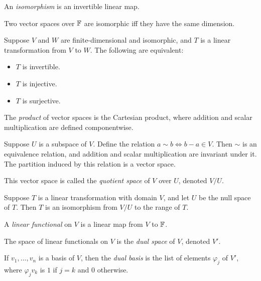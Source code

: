 \begin{defn}
  An \emph{isomorphism} is an invertible linear map.
\end{defn}
\begin{prop}
  Two vector spaces over $\mathbb{F}$ are isomorphic iff they have
  the same dimension.
\end{prop}
\begin{prop}
  Suppose $V$ and $W$ are finite-dimensional and isomorphic,
  and $T$ is a linear transformation from $V$
  to $W$. The following are equivalent:
  \begin{itemize}
    \item $T$ is invertible.
    \item $T$ is injective.
    \item $T$ is surjective.
  \end{itemize}
\end{prop}
\begin{defn}
  The \emph{product} of vector spaces is the Cartesian product, where addition
  and scalar multiplication are defined componentwise.
\end{defn}
\begin{prop}
  Suppose $U$ is a subspace of $V$. Define the relation $a\sim b\iff b-a\in V$.
  Then $\sim$ is an equivalence relation, and addition and scalar multiplication
  are invariant under it. The partition induced by this relation is a vector
  space.
\end{prop}
\begin{defn}
  This vector space is called the \emph{quotient space} of $V$ over $U$, denoted
  $V/U$.
\end{defn}
\begin{prop}
  Suppose $T$ is a linear transformation with domain $V$, and let $U$ be the null space of $T$.
  Then $T$ is an isomorphism from $V/U$ to the range of $T$.
\end{prop}
\begin{defn}
  A \emph{linear functional} on $V$ is a linear map from $V$ to $\mathbb{F}$.
\end{defn}
\begin{defn}
  The space of linear functionals on $V$ is the \emph{dual space} of $V$,
  denoted $V'$.
\end{defn}
\begin{defn}
  If $v_1,\ldots,v_n$ is a basis of $V$, then the \emph{dual basis} is the list
  of
  elements $\varphi_j$ of $V'$, where $\varphi_j v_k$ is $1$ if $j=k$ and $0$
  otherwise.
\end{defn}
